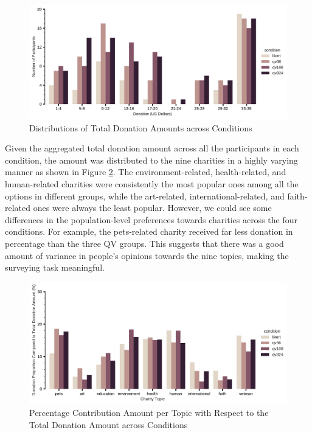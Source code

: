 \begin{figure}[htpb]
    \centering
    \includegraphics[width=\textwidth, keepaspectratio=true]{content/image/total_contributions_across_conditions.pdf}
    \caption{
       Distributions of Total Donation Amounts across Conditions
    }
    \label{fig:total_don_exp1}
\end{figure}

Given the aggregated total donation amount across all the participants in each condition, the amount was distributed to the nine charities in a highly varying manner as shown in Figure \ref{fig:topic_don_exp1}. The environment-related, health-related, and human-related charities were consistently the most popular ones among all the options in different groups, while the art-related, international-related, and faith-related ones were always the least popular. However, we could see some differences in the population-level preferences towards charities across the four conditions. For example, the pets-related charity received far less donation in percentage than the three QV groups. This suggests that there was a good amount of variance in people's opinions towards the nine topics, making the surveying task meaningful.

\begin{figure}[htpb]
    \centering
    \includegraphics[width=\textwidth, keepaspectratio=true]{content/image/normalized_contributions_per_topic_across_conditions.pdf}
    \caption{
      Percentage Contribution Amount per Topic with Respect to the Total Donation Amount across Conditions
    }
    \label{fig:topic_don_exp1}
\end{figure}

